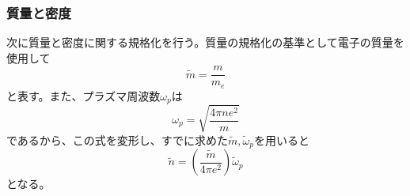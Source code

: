 \documentclass[a4paper,11pt,titlepage]{jsarticle}
\begin{document}
  \subsubsection{質量と密度}
  次に質量と密度に関する規格化を行う。質量の規格化の基準として電子の質量を使用して
  \begin{equation}
    \label{eq:3-2-7}
    \tilde m=\frac{m}{m_e}
  \end{equation}
  と表す。また、プラズマ周波数$\omega_p$は
  \begin{equation}
    \label{eq:3-2-8}
    \omega_p=\sqrt{\frac{4\pi n e^2}{m}}
  \end{equation}
  であるから、この式を変形し、すでに求めた$\tilde m,\tilde \omega_p$を用いると
  \begin{equation}
    \label{eq:3-2-9}
    \tilde n= (\frac{\tilde m}{4\pi e^2})\tilde \omega_p
  \end{equation}
  となる。\\
\end{document}
